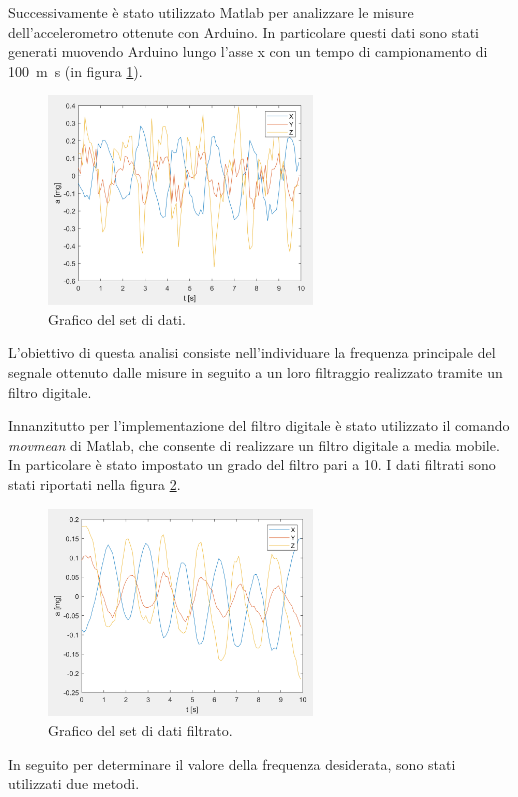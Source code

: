 Successivamente è stato utilizzato Matlab per analizzare le misure dell'accelerometro ottenute con Arduino. In particolare questi dati sono stati generati muovendo Arduino lungo l'asse x con un tempo di campionamento di \SI{100}{m\second} (in figura \ref{fig:plot_dati}).
\begin{figure}[tbh]
	\centering		\includegraphics[width=7cm]{./ImageFiles/plot1_arr2.png}
	\caption{Grafico del set di dati.}
	\label{fig:plot_dati}
\end{figure}

L'obiettivo di questa analisi consiste nell'individuare la frequenza principale del segnale ottenuto dalle misure in seguito a un loro filtraggio realizzato tramite un filtro digitale.

Innanzitutto per l'implementazione del filtro digitale è stato utilizzato il comando \textit{movmean} di Matlab, che consente di realizzare un filtro digitale a media mobile. In particolare è stato impostato un grado del filtro pari a 10. I dati filtrati sono stati riportati nella figura \ref{fig:plot_dati_filt}.
\begin{figure}[tbh]
	\centering		\includegraphics[width=7cm]{./ImageFiles/plot1filt_arr2.png}
	\caption{Grafico del set di dati filtrato.}
	\label{fig:plot_dati_filt}
\end{figure}

In seguito per determinare il valore della frequenza desiderata, sono stati utilizzati due metodi.

